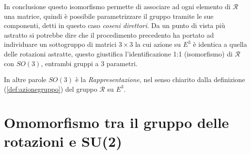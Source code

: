 \documentclass[11pt]{report}
\theoremstyle{plain}
\theoremstyle{definition}
\theoremstyle{remark}
\begin{document}

In conclusione questo isomorfismo permette di associare ad ogni elemento di $\mathscr{R}$  una matrice, quindi è possibile parametrizzare il gruppo tramite le sue componenti, detti in questo caso \emph{coseni direttori}.
Da  un punto di vista più astratto si potrebbe dire che il procedimento precedento ha portato ad individuare un sottogruppo di matrici $3 \times 3$ la cui azione su $E^{3}$ è identica a quella delle rotazioni astratte, questo giustifica l'identificazione 1:1 (isomorfismo) di $\mathscr{R}$ con $SO(3)$, entrambi gruppi a 3 parametri.

In altre parole $SO(3)$ è la \emph{Rappresentazione}, nel senso chiarito dalla definizione (\ref{def:azionegruppo}) del gruppo $\mathscr{R}$ su $E^{3}$.


\section{Omomorfismo tra il gruppo delle rotazioni e  SU(2)}
\end{document}
